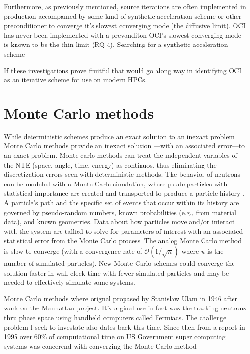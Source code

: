 Furthermore, as previously mentioned, source iterations are often implemented in production accompanied by some kind of synthetic-acceleration scheme or other preconditioner to converge it's slowest converging mode (the diffusive limit).
OCI has never been implemented with a prevonditon
OCI's slowest converging mode is known to be the thin limit (RQ 4).
Searching for a synthetic acceleration scheme

If these investigations prove fruitful that would go along way in identifying OCI as an iterative scheme for use on modern HPCs.

\section {Monte Carlo methods}



While deterministic schemes produce an exact solution to an inexact problem Monte Carlo methods provide an inexact solution ---with an associated error---to an exact problem.
Monte carlo methods can treat the independent variables of the NTE (space, angle, time, energy) as continuos, thus eliminating the discretization errors seen with deterministic methods.
The behavior of neutrons can be modeled with a Monte Carlo simulation, where psude-particles with statistical importance are created and transported to produce a particle history \cite{lewis_computational_1984}.
A particle's path and the specific set of events that occur within its history are governed by pseudo-random numbers, known probabilities (e.g., from material data), and known geometries.
Data about how particles move and/or interact with the system are tallied to solve for parameters of interest with an associated statistical error from the Monte Carlo process. 
The analog Monte Carlo method is slow to converge (with a convergence rate of $\mathcal{O}(1/\sqrt{n})$ where $n$ is the number of simulated particles).
New Monte Carlo schemes could converge the solution faster in wall-clock time with fewer simulated particles and may be needed to effectively simulate some systems.

Monte Carlo methods where orignal propased by Stanislaw Ulam in 1946 after work on the Manhattan project.
It's orginal use in fact was the tracking neutrons thru phase space using handheld computers called Fermiacs.
The challenge problem I seek to investate also dates back this time.
Since then from a report in 1995 over 60\% of computational time on US Government super computing systems was concerend with converging the Monte Carlo method

